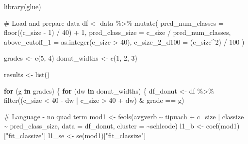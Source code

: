 \documentclass[
  letterpaper,
  DIV=11,
  numbers=noendperiod]{scrartcl}
\newenvironment{Shaded}{\begin{snugshade}}{\end{snugshade}}
\newcommand{\AttributeTok}[1]{\textcolor[rgb]{0.40,0.45,0.13}{#1}}
\newcommand{\CommentTok}[1]{\textcolor[rgb]{0.37,0.37,0.37}{#1}}
\newcommand{\ControlFlowTok}[1]{\textcolor[rgb]{0.00,0.23,0.31}{\textbf{#1}}}
\newcommand{\DecValTok}[1]{\textcolor[rgb]{0.68,0.00,0.00}{#1}}
\newcommand{\FunctionTok}[1]{\textcolor[rgb]{0.28,0.35,0.67}{#1}}
\newcommand{\NormalTok}[1]{\textcolor[rgb]{0.00,0.23,0.31}{#1}}
\newcommand{\OtherTok}[1]{\textcolor[rgb]{0.00,0.23,0.31}{#1}}
\newcommand{\SpecialCharTok}[1]{\textcolor[rgb]{0.37,0.37,0.37}{#1}}
\newcommand{\StringTok}[1]{\textcolor[rgb]{0.13,0.47,0.30}{#1}}
\begin{document}
\begin{Shaded}
\begin{Highlighting}[]
\FunctionTok{library}\NormalTok{(glue)}

\CommentTok{\# Load and prepare data}
\NormalTok{df }\OtherTok{\textless{}{-}}\NormalTok{ data }\SpecialCharTok{\%\textgreater{}\%}  
  \FunctionTok{mutate}\NormalTok{(}
    \AttributeTok{pred\_num\_classes =} \FunctionTok{floor}\NormalTok{((c\_size }\SpecialCharTok{{-}} \DecValTok{1}\NormalTok{) }\SpecialCharTok{/} \DecValTok{40}\NormalTok{) }\SpecialCharTok{+} \DecValTok{1}\NormalTok{,}
    \AttributeTok{pred\_class\_size =}\NormalTok{ c\_size }\SpecialCharTok{/}\NormalTok{ pred\_num\_classes,}
    \AttributeTok{above\_cutoff\_1 =} \FunctionTok{as.integer}\NormalTok{(c\_size }\SpecialCharTok{\textgreater{}} \DecValTok{40}\NormalTok{),}
    \AttributeTok{c\_size\_2\_d100 =}\NormalTok{ (c\_size}\SpecialCharTok{\^{}}\DecValTok{2}\NormalTok{) }\SpecialCharTok{/} \DecValTok{100}
\NormalTok{  )}

\NormalTok{grades }\OtherTok{\textless{}{-}} \FunctionTok{c}\NormalTok{(}\DecValTok{5}\NormalTok{, }\DecValTok{4}\NormalTok{)}
\NormalTok{donut\_widths }\OtherTok{\textless{}{-}} \FunctionTok{c}\NormalTok{(}\DecValTok{1}\NormalTok{, }\DecValTok{2}\NormalTok{, }\DecValTok{3}\NormalTok{)}

\NormalTok{results }\OtherTok{\textless{}{-}} \FunctionTok{list}\NormalTok{()}

\ControlFlowTok{for}\NormalTok{ (g }\ControlFlowTok{in}\NormalTok{ grades) \{}
  \ControlFlowTok{for}\NormalTok{ (dw }\ControlFlowTok{in}\NormalTok{ donut\_widths) \{}
\NormalTok{    df\_donut }\OtherTok{\textless{}{-}}\NormalTok{ df }\SpecialCharTok{\%\textgreater{}\%}
      \FunctionTok{filter}\NormalTok{((c\_size }\SpecialCharTok{\textless{}} \DecValTok{40} \SpecialCharTok{{-}}\NormalTok{ dw }\SpecialCharTok{|}\NormalTok{ c\_size }\SpecialCharTok{\textgreater{}} \DecValTok{40} \SpecialCharTok{+}\NormalTok{ dw) }\SpecialCharTok{\&}\NormalTok{ grade }\SpecialCharTok{==}\NormalTok{ g)}

    \CommentTok{\# Language {-} no quad term}
\NormalTok{    mod1 }\OtherTok{\textless{}{-}} \FunctionTok{feols}\NormalTok{(avgverb }\SpecialCharTok{\textasciitilde{}}\NormalTok{ tipuach }\SpecialCharTok{+}\NormalTok{ c\_size }\SpecialCharTok{|}\NormalTok{ classize }\SpecialCharTok{\textasciitilde{}}\NormalTok{ pred\_class\_size, }\AttributeTok{data =}\NormalTok{ df\_donut, }\AttributeTok{cluster =} \SpecialCharTok{\textasciitilde{}}\NormalTok{schlcode)}
\NormalTok{    l1\_b }\OtherTok{\textless{}{-}} \FunctionTok{coef}\NormalTok{(mod1)[}\StringTok{"fit\_classize"}\NormalTok{]}
\NormalTok{    l1\_se }\OtherTok{\textless{}{-}} \FunctionTok{se}\NormalTok{(mod1)[}\StringTok{"fit\_classize"}\NormalTok{]}


\end{Highlighting}
\end{Shaded}
\end{document}
